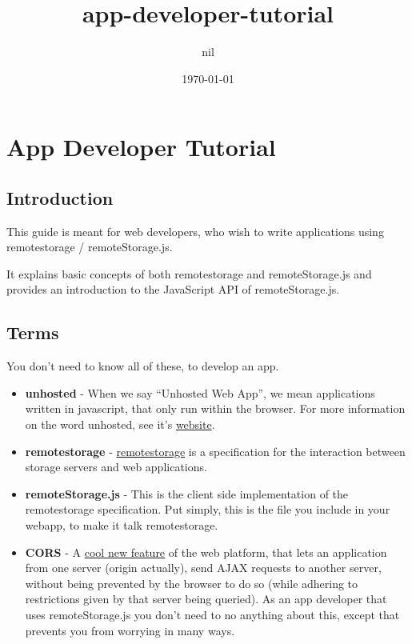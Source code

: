 \documentclass[11pt]{article}
\title{app-developer-tutorial}
\author{nil}
\date{\today}
\begin{document}
\maketitle

\setcounter{tocdepth}{3}
\tableofcontents
\vspace*{1cm}
\section{App Developer Tutorial}
\label{sec-1}
\subsection{Introduction}
\label{sec-1-1}


   This guide is meant for web developers, who wish to write applications using remotestorage / remoteStorage.js.

   It explains basic concepts of both remotestorage and remoteStorage.js and provides an introduction to the JavaScript API of remoteStorage.js.
\subsection{Terms}
\label{sec-1-2}


   You don't need to know all of these, to develop an app.

\begin{itemize}
\item \textbf{unhosted} - When we say ``Unhosted Web App'', we mean applications written in javascript, that only run within the browser. For more information on the word unhosted, see it's \href{http://unhosted.org}{website}.
\item \textbf{remotestorage} - \href{http://remotestorage.io}{remotestorage} is a specification for the interaction between storage servers and web applications.
\item \textbf{remoteStorage.js} - This is the client side implementation of the remotestorage specification. Put simply, this is the file you include in your webapp, to make it talk remotestorage.
\item \textbf{CORS} - A \href{http://enable-cors.org/}{cool new feature} of the web platform, that lets an application from one server (origin actually), send AJAX requests to another server, without being prevented by the browser to do so (while adhering to restrictions given by that server being queried). As an app developer that uses remoteStorage.js you don't need to no anything about this, except that prevents you from worrying in many ways.
\end{itemize}
\end{document}
